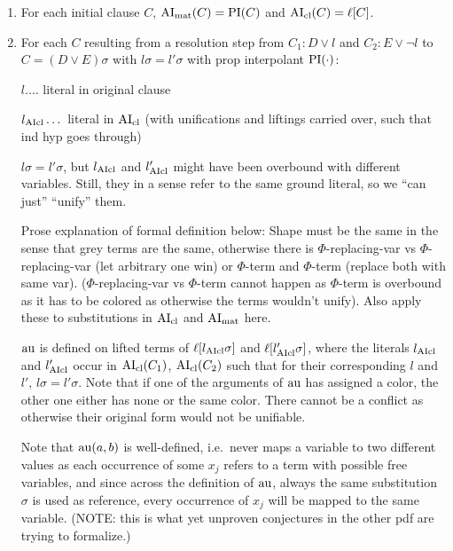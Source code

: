 \documentclass[,%
	paper=a4,%
	DIV10, %
	twoside=false,%
	liststotoc,
	bibtotoc,
	draft=false,%
	numbers=noendperiod
]{scrartcl}
\begin{document}
\begin{enumerate}
	\item 
		For each initial clause $C$, $\operatorname{AI}_\mathrm{mat}(C) = \operatorname{PI}(C)$ and $\operatorname{AI}_\mathrm{cl}(C) = \ell[C]$.

	\item
		For each $C$ resulting from a resolution step from $C_1: D\lor l$ and $C_2: E\lor \lnot l$ to $C = (D \lor E)\sigma$ with $l\sigma = l'\sigma$ with prop interpolant $\operatorname{PI}(\cdot)$:

		$l.\dotsc$ literal in original clause

		$l_{\operatorname{AIcl}}\dotsc$ literal in $\operatorname{AI}_\mathrm{cl}$ (with unifications and liftings carried over, such that ind hyp goes through)


		$l\sigma = l'\sigma$, but $l_{\operatorname{AIcl}}$ and $l_{\operatorname{AIcl}}'$ might have been overbound with different variables. Still, they in a sense refer to the same ground literal, so we ``can just'' ``unify'' them.

		Prose explanation of formal definition below: Shape must be the same in the sense that grey terms are the same, otherwise there is $\Phi$-replacing-var vs $\Phi$-replacing-var (let arbitrary one win) or $\Phi$-term and $\Phi$-term (replace both with same var). 
		($\Phi$-replacing-var vs $\Phi$-term cannot happen as $\Phi$-term is overbound as it has to be colored as otherwise the terms wouldn't unify).
		Also apply these to substitutions in $\operatorname{AI}_\mathrm{cl}$ and $\operatorname{AI}_\mathrm{mat}$ here.

		$\operatorname{au}$ is defined on lifted terms of $\ell[l_{\operatorname{AIcl}}\sigma]$ and $\ell[l_{\operatorname{AIcl}}'\sigma]$, where the literals $l_{\operatorname{AIcl}}$ and $l_{\operatorname{AIcl}}'$
		occur in $\operatorname{AI}_\mathrm{cl}(C_1)$, $\operatorname{AI}_\mathrm{cl}(C_2)$ such that for their corresponding $l$ and $l'$, $l\sigma = l'\sigma$.
		Note that if one of the arguments of $\operatorname{au}$ has assigned a color, the other one either has none or the same color.
		There cannot be a conflict as otherwise their original form would not be unifiable.

		Note that $\operatorname{au}(a, b)$ is well-defined, i.e.~never maps a variable to two different values as each occurrence of some $x_j$ refers to a term with possible free variables, and since across the definition of $\operatorname{au}$, always the same substitution $\sigma$ is used as reference, every occurrence of $x_j$ will be mapped to the same variable. (NOTE: this is what yet unproven conjectures in the other pdf are trying to formalize.)



\end{enumerate}
\end{document}
